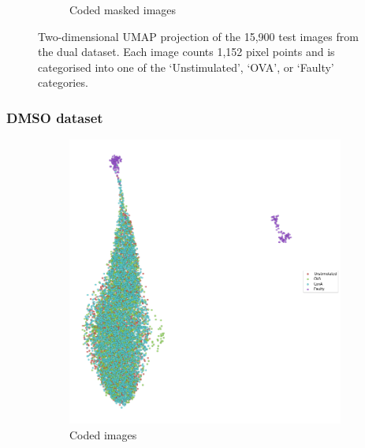 \begin{figure}[h!]
\begin{subfigure}[h!]{0.45\textwidth}
        \caption{Coded masked images}
    \end{subfigure}
    \caption{Two-dimensional UMAP projection of the 15,900 test images from the dual dataset. Each image counts 1,152 pixel points and is categorised into one of the `Unstimulated', `OVA', or `Faulty' categories.}
    \label{fig:my_label}
\end{figure}

\bigskip
\subsubsection{DMSO dataset}
\hfill
\hfill

\begin{figure}[h!]
    \centering
    \begin{subfigure}[h!]{0.45\textwidth}
        \includegraphics[width=\textwidth]{dissertation/figures/CK19_baseline_visualisation.png}
        \caption{Coded images}
    \end{subfigure}
    \begin{subfigure}[h!]{0.45\textwidth}

\end{subfigure}
\end{figure}
